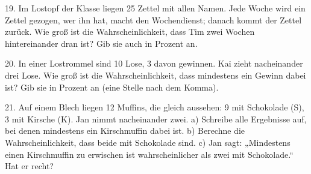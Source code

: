\documentclass[11pt]{article}
\begin{document}
\begin{pfaufg}{}{19.}{}
Im Lostopf der Klasse liegen 25 Zettel mit allen Namen. Jede Woche wird ein Zettel gezogen, wer ihn hat, macht den Wochendienst; danach kommt der Zettel zurück. Wie groß ist die Wahrscheinlichkeit, dass Tim zwei Wochen hintereinander dran ist? Gib sie auch in Prozent an.
\end{pfaufg}

\begin{pfaufg}{}{20.}{}
In einer Lostrommel sind 10 Lose, 3 davon gewinnen. Kai zieht nacheinander drei Lose. Wie groß ist die Wahrscheinlichkeit, dass mindestens ein Gewinn dabei ist? Gib sie in Prozent an (eine Stelle nach dem Komma).
\end{pfaufg}

\begin{pfaufg}{}{21.}{}
Auf einem Blech liegen 12 Muffins, die gleich aussehen: 9 mit Schokolade (S), 3 mit Kirsche (K). Jan nimmt nacheinander zwei. a) Schreibe alle Ergebnisse auf, bei denen mindestens ein Kirschmuffin dabei ist. b) Berechne die Wahrscheinlichkeit, dass beide mit Schokolade sind. c) Jan sagt: „Mindestens einen Kirschmuffin zu erwischen ist wahrscheinlicher als zwei mit Schokolade.“ Hat er recht?
\end{pfaufg}

\par\vfill{}
\end{document}
